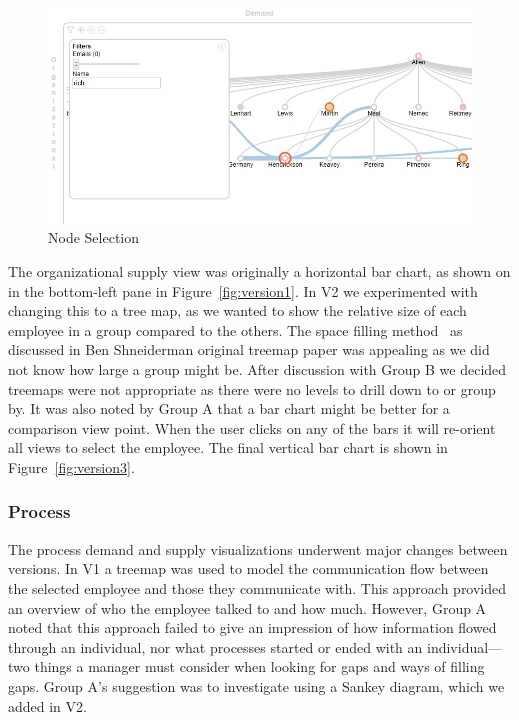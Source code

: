\documentclass[journal]{vgtc}                %
\begin{document}
\begin{figure}
  \centering
  \includegraphics[width=\columnwidth]{pictures/orgdemand.jpg}
  \caption{Node Selection}
  \label{fig:node}
\end{figure}

The organizational supply view was originally a horizontal bar chart, as shown on in the bottom-left pane in Figure~\ref{fig:version1}.  In V2 we experimented with changing this to a tree map, as we wanted to show the relative size of each employee in a group compared to the others.  The space filling method~\cite{shneiderman1992tree} as discussed in Ben Shneiderman original treemap paper was appealing as we did not know how large a group might be.  After discussion with Group B we decided treemaps were not appropriate as there were no levels to drill down to or group by.  It was also noted by Group A that a bar chart might be better for a comparison view point.  When the user clicks on any of the bars it will re-orient all views to select the employee.  The final vertical bar chart is shown in Figure~\ref{fig:version3}.

\subsubsection{Process}

The process demand and supply visualizations underwent major changes between versions.  In V1 a treemap was used to model the communication flow between the selected employee and those they communicate with.  This approach provided an overview of who the employee talked to and how much. However, Group A noted that this approach failed to give an impression of how information flowed through an individual, nor what processes started or ended with an individual---two things a manager must consider when looking for gaps and ways of filling gaps.  Group A's suggestion was to investigate using a Sankey diagram, which we added in V2.
\end{document}
